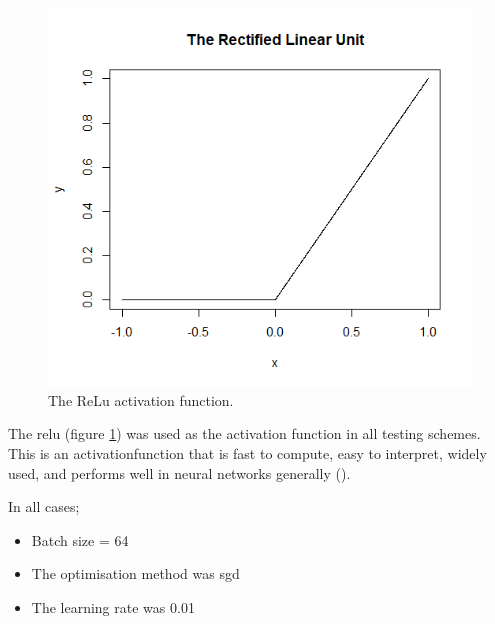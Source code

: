 \begin{figure}
    \includegraphics[scale=0.5]{figs/relu.png}
    \caption{The ReLu activation function.}
    \label{fig:relu_function}
\end{figure}

The \gls{relu} (figure \ref{fig:relu_function}) was used as the activation function in all testing schemes. This is an \gls{activationfunction} that is fast to compute, easy to interpret, widely used, and performs well in neural networks generally (\cite{activation_search}). 
\bigskip

In all cases;

\begin{itemize}
    \item Batch size = 64
    \item The optimisation method was \gls{sgd}
    \item The learning rate was 0.01
\end{itemize}

